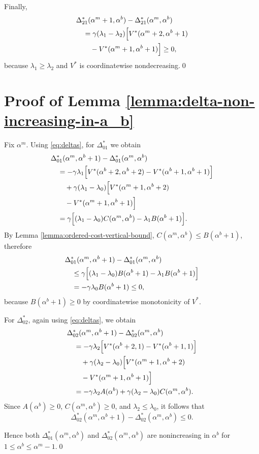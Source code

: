 \documentclass[letterpaper,journal]{IEEEtran}
\begin{document}
Finally,
\[
\begin{aligned}
&\Delta^*_{21}(\alpha^m+1,\alpha^b)-\Delta^*_{21}(\alpha^m,\alpha^b)\\
&\quad=\gamma(\lambda_1-\lambda_2)\Bigl[
V^*(\alpha^m+2,\alpha^b+1)\\
&\qquad -V^*(\alpha^m+1,\alpha^b+1)\Bigr]
\geq 0,
\end{aligned}
\]
because $\lambda_1\geq \lambda_2$ and $V^*$ is coordinatewise nondecreasing.\qed


\section{Proof of Lemma \ref{lemma:delta-non-increasing-in-a_b}}
\label{app:delta-non-increasing-in-a_b}

Fix $\alpha^m$. Using \eqref{eq:deltas}, for $\Delta^*_{01}$ we obtain
\begin{align*}
&\Delta^*_{01}(\alpha^m,\alpha^b+1)-\Delta^*_{01}(\alpha^m,\alpha^b)\\
&\quad=
-\gamma\lambda_1\Bigl[
V^*(\alpha^b+2,\alpha^b+2)-V^*(\alpha^b+1,\alpha^b+1)
\Bigr]\\
&\qquad
+\gamma(\lambda_1-\lambda_0)\Bigl[
V^*(\alpha^m+1,\alpha^b+2)\\
&\qquad -V^*(\alpha^m+1,\alpha^b+1)
\Bigr]\\
&\quad =\gamma\Bigl[(\lambda_1-\lambda_0)C(\alpha^m,\alpha^b)-\lambda_1B(\alpha^b+1)\Bigr].
\end{align*}
By Lemma \ref{lemma:ordered-cost-vertical-bound}, $C(\alpha^m,\alpha^b)\le B(\alpha^b+1)$, therefore
\begin{align*}
&\Delta^*_{01}(\alpha^m,\alpha^b+1)-\Delta^*_{01}(\alpha^m,\alpha^b)\\
&\quad\le
\gamma\Bigl[(\lambda_1-\lambda_0)B(\alpha^b+1)-\lambda_1B(\alpha^b+1)\Bigr]\\
&\quad=
-\gamma\lambda_0B(\alpha^b+1)\le 0,
\end{align*}
because $B(\alpha^b+1)\ge 0$ by coordinatewise monotonicity of $V^*$.

For $\Delta^*_{02}$, again using \eqref{eq:deltas}, we obtain
\begin{align*}
&\Delta^*_{02}(\alpha^m,\alpha^b+1)-\Delta^*_{02}(\alpha^m,\alpha^b)\\
&\quad= -\gamma\lambda_2\Bigl[V^*(\alpha^b+2,1)-V^*(\alpha^b+1,1)\Bigr]\\
&\qquad +\gamma(\lambda_2-\lambda_0)\Bigl[V^*(\alpha^m+1,\alpha^b+2)\\
&\qquad -V^*(\alpha^m+1,\alpha^b+1)\Bigr]\\
&\quad= -\gamma\lambda_2A(\alpha^b)+\gamma(\lambda_2-\lambda_0)C(\alpha^m,\alpha^b).
\end{align*}
Since $A(\alpha^b)\geq 0$, $C(\alpha^m,\alpha^b)\geq 0$, and $\lambda_2\leq \lambda_0$, it follows that
\[
\Delta^*_{02}(\alpha^m,\alpha^b+1)-\Delta^*_{02}(\alpha^m,\alpha^b)\leq 0.
\]

Hence both $\Delta^*_{01}(\alpha^m,\alpha^b)$ and $\Delta^*_{02}(\alpha^m,\alpha^b)$ are
nonincreasing in $\alpha^b$ for $1\le \alpha^b\le \alpha^m-1$.\qed
\end{document}
